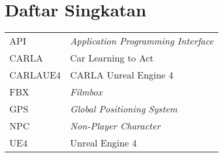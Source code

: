 \chapter*{Daftar Singkatan}

\begingroup
\def\arraystretch{1.25}
\begin{tabular}{p{4cm}l}
	API & \textit{Application Programming Interface} \\
	CARLA & Car Learning to Act \\
	CARLAUE4 & CARLA Unreal Engine 4 \\
	FBX & \textit{Filmbox} \\
	GPS & \textit{Global Positioning System} \\
	NPC & \textit{Non-Player Character} \\
	UE4 & Unreal Engine 4 \\


\end{tabular}
\endgroup
\clearpage
